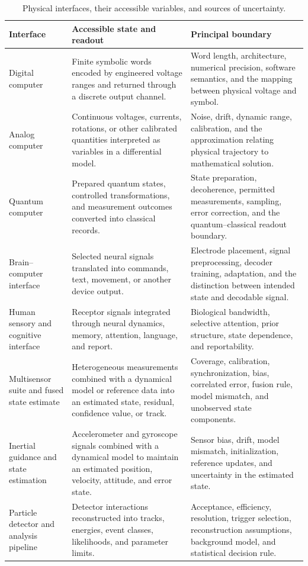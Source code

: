 \begin{table}[tbp]
\centering
\caption{Physical interfaces, their accessible variables, and sources of uncertainty.}
\label{tab:heterogeneousinterfaces}
\small
\begin{tabularx}{\textwidth}{@{}p{}p{}X@{}}
\toprule
Interface & Accessible state and readout & Principal boundary \\
\midrule
Digital computer & Finite symbolic words encoded by engineered voltage ranges and returned through a discrete output channel. & Word length, architecture, numerical precision, software semantics, and the mapping between physical voltage and symbol. \\
Analog computer & Continuous voltages, currents, rotations, or other calibrated quantities interpreted as variables in a differential model. & Noise, drift, dynamic range, calibration, and the approximation relating physical trajectory to mathematical solution. \\
Quantum computer & Prepared quantum states, controlled transformations, and measurement outcomes converted into classical records. & State preparation, decoherence, permitted measurements, sampling, error correction, and the quantum--classical readout boundary. \\
Brain--computer interface & Selected neural signals translated into commands, text, movement, or another device output. & Electrode placement, signal preprocessing, decoder training, adaptation, and the distinction between intended state and decodable signal. \\
Human sensory and cognitive interface & Receptor signals integrated through neural dynamics, memory, attention, language, and report. & Biological bandwidth, selective attention, prior structure, state dependence, and reportability. \\
Multisensor suite and fused state estimate & Heterogeneous measurements combined with a dynamical model or reference data into an estimated state, residual, confidence value, or track. & Coverage, calibration, synchronization, bias, correlated error, fusion rule, model mismatch, and unobserved state components. \\
Inertial guidance and state estimation & Accelerometer and gyroscope signals combined with a dynamical model to maintain an estimated position, velocity, attitude, and error state. & Sensor bias, drift, model mismatch, initialization, reference updates, and uncertainty in the estimated state. \\
Particle detector and analysis pipeline & Detector interactions reconstructed into tracks, energies, event classes, likelihoods, and parameter limits. & Acceptance, efficiency, resolution, trigger selection, reconstruction assumptions, background model, and statistical decision rule. \\
\bottomrule
\end{tabularx}
\end{table}


